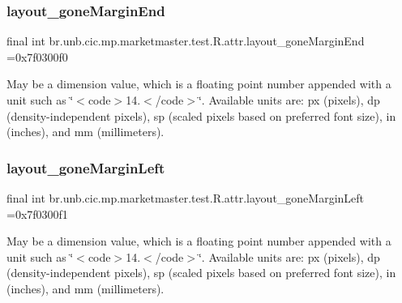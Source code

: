 \subsubsection{\texorpdfstring{layout\+\_\+gone\+Margin\+End}{layout\_goneMarginEnd}}
{\footnotesize\ttfamily final int br.\+unb.\+cic.\+mp.\+marketmaster.\+test.\+R.\+attr.\+layout\+\_\+gone\+Margin\+End =0x7f0300f0\hspace{0.3cm}{\ttfamily [static]}}

May be a dimension value, which is a floating point number appended with a unit such as \char`\"{}$<$code$>$14.\+5sp$<$/code$>$\char`\"{}. Available units are\+: px (pixels), dp (density-\/independent pixels), sp (scaled pixels based on preferred font size), in (inches), and mm (millimeters). \mbox{\label{classbr_1_1unb_1_1cic_1_1mp_1_1marketmaster_1_1test_1_1R_1_1attr_a1cd12209b618ef5871e7fa5a0fa52050}} 
\subsubsection{\texorpdfstring{layout\+\_\+gone\+Margin\+Left}{layout\_goneMarginLeft}}
{\footnotesize\ttfamily final int br.\+unb.\+cic.\+mp.\+marketmaster.\+test.\+R.\+attr.\+layout\+\_\+gone\+Margin\+Left =0x7f0300f1\hspace{0.3cm}{\ttfamily [static]}}

May be a dimension value, which is a floating point number appended with a unit such as \char`\"{}$<$code$>$14.\+5sp$<$/code$>$\char`\"{}. Available units are\+: px (pixels), dp (density-\/independent pixels), sp (scaled pixels based on preferred font size), in (inches), and mm (millimeters). \mbox{\label{classbr_1_1unb_1_1cic_1_1mp_1_1marketmaster_1_1test_1_1R_1_1attr_a03b83cf0f311df410da1175763ab2cd6}} 
